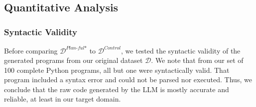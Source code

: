 \subsection{Quantitative Analysis}

\subsubsection{Syntactic Validity}
\label{sec:quant_accuracy}

Before comparing \(\mathcal{D}^{\textit{Plan-ful*}}\) to \(\mathcal{D}^{\textit{Control}}\), we tested the syntactic validity of the generated programs from our original dataset \(\mathcal{D}\).
We note that from our set of 100 complete Python programs, all but one were syntactically valid. That program included a syntax error and could not be parsed nor executed. Thus, we conclude that the raw code generated by the LLM is mostly accurate and reliable, at least in our target domain. 


            


